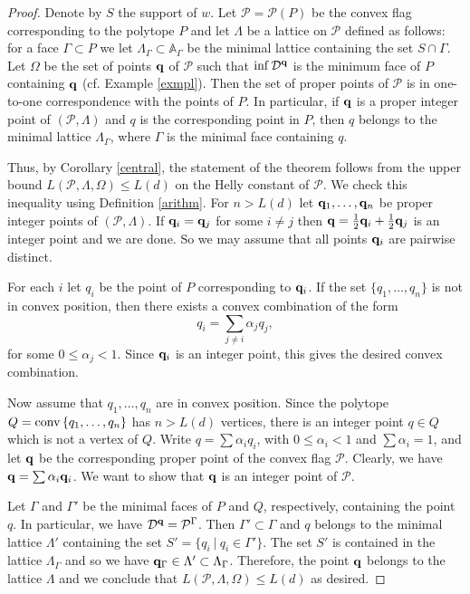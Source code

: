 \documentclass{daj}
\renewcommand{\le}{\leqslant}
\newcommand{\A}{\mathbb A}
\newcommand{\conv}{{\rm conv}\,}
\newcommand{\D}{\mathcal D}
\renewcommand{\P}{\mathcal P}
\theoremstyle{definition}
\theoremstyle{remark}
\theoremstyle{definition}
\theoremstyle{definition}
\begin{document}
\begin{proof}
Denote by $S$ the support of $w$.
Let $\P = \P(P)$ be the convex flag corresponding to the polytope $P$ and let $\Lambda$ be a lattice on $\P$ defined as follows: for a face $\Gamma \subset P$ we let $\Lambda_\Gamma \subset \A_\Gamma$ be the minimal lattice containing the set $S \cap \Gamma$. 
Let $\Omega$ be the set of points ${\bf q}$ of $\P$ such that $\inf \D^{\bf q}$ is the minimum face of $P$ containing ${\bf q}$ (cf. Example \ref{exmpl}). 
Then the set of proper points of $\P$ is in one-to-one correspondence with the points of $P$. In particular, if ${\bf q}$ is a proper integer point of $(\P, \Lambda)$ and $q$ is the corresponding point in $P$, then $q$ belongs to the minimal lattice $\Lambda_\Gamma$, where $\Gamma$ is the minimal face containing $q$.

Thus, by Corollary \ref{central}, the statement of the theorem follows from the upper bound $L(\P, \Lambda, \Omega) \le L(d)$ on the Helly constant of $\P$.
We check this inequality using Definition \ref{arithm}.
For $n > L(d)$ let ${\bf q}_1, \ldots, {\bf q}_n$ be proper integer points of $(\P, \Lambda)$. 
If ${\bf q}_i = {\bf q}_j$ for some $i\neq j$ then ${\bf q} = \frac{1}{2}{\bf q}_i + \frac{1}{2} {\bf q}_j$ is an integer point and we are done. So we may assume that all points ${\bf q}_i$ are pairwise distinct. 

For each $i$ let $q_i$ be the point of $P$ corresponding to ${\bf q}_i$. If the set $\{q_1, \ldots, q_n\}$ is not in convex position, then there exists a convex combination of the form
$$
q_i = \sum_{j \neq i} \alpha_j q_j,
$$
for some $0\le \alpha_j < 1$. Since ${\bf q}_i$ is an integer point, this gives the desired convex combination.

Now assume that $q_1, \ldots, q_n$ are in convex position. Since the polytope  $Q = \conv\{q_1, \ldots, q_n\}$ has $n > L(d)$ vertices, there is an integer point $q \in Q$ which is not a vertex of $Q$. Write $q = \sum \alpha_i q_i$, with $0\le \alpha_i<1$ and $\sum \alpha_i = 1$, and let ${\bf q}$ be the corresponding proper point of the convex flag $\P$. Clearly, we have ${\bf q} = \sum \alpha_i {\bf q}_i$. We want to show that ${\bf q}$ is an integer point of $\P$.

Let $\Gamma$ and $\Gamma'$ be the minimal faces of $P$ and $Q$, respectively, containing the point $q$. In particular, we have $\D^{\bf q} = \P^\Gamma$. Then $\Gamma' \subset \Gamma$ and $q$ belongs to the minimal lattice $\Lambda'$ containing the set $S' = \{q_i~|~q_i \in \Gamma'\}$. The set $S'$ is contained in the lattice $\Lambda_\Gamma$ and so we have ${\bf q}_\Gamma \in \Lambda' \subset \Lambda_\Gamma$.
Therefore, the point ${\bf q}$ belongs to the lattice $\Lambda$ and we conclude that $L(\P, \Lambda, \Omega) \le L(d)$ as desired.
\end{proof}
\end{document}
